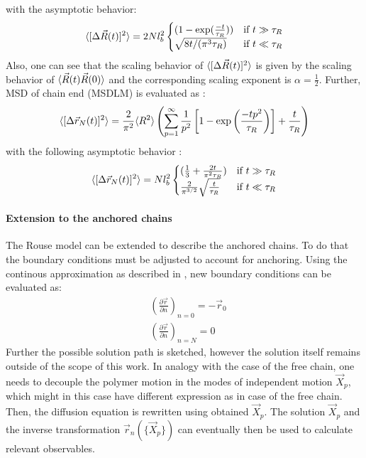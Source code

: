\documentclass[
    paper=A4,pagesize=automedia,fontsize=12pt,
    BCOR=15mm,DIV=22,
    twoside,headinclude,footinclude=false,
    fleqn,             %
    bibliography=totocnumbered,          %
    listof=totoc,                %
    listof=flat,                 %
    cleardoublepage=empty      %
    numbers=endperiod
]{scrartcl}
\begin{document}
with the asymptotic behavior:
\begin{equation}
    \langle[\Delta \vec{R}(t)]^2\rangle = 2Nl_b^2 \begin{cases}
        (1-\exp(\frac{-t}{\tau_R})) & \text{if } t \gg \tau_R \\
        \sqrt{8t/(\pi^3\tau_R)} & \text{if } t \ll \tau_R
    \end{cases}
\end{equation}
Also, one can see that the scaling behavior of $\langle[\Delta \vec{R}(t)]^2\rangle$ is given
by the scaling behavior of $\langle\vec{R}(t)\vec{R}(0)\rangle$ and the corresponding
scaling exponent is $\alpha = \frac{1}{2}$. Further, 
MSD of chain end (MSDLM) is evaluated as \cite{svaneborg_2020}:
\begin{equation}
    \langle[\Delta \vec{r}_N(t)]^2\rangle = \frac{2}{\pi^2} \langle R^2\rangle \left( \sum_{p=1}^{\infty} \frac{1}{p^2} \left[ 1-\exp\left(\frac{-t p^2}{\tau_R}\right) \right] + \frac{t}{\tau_R} \right)
\end{equation}
with the following asymptotic behavior \cite{svaneborg_2020}:
\begin{equation}
    \langle[\Delta \vec{r}_N(t)]^2\rangle = N l_b^2 \begin{cases}
        (\frac{1}{3} + \frac{2t}{\pi^2 \tau_R}) & \text{if } t \gg \tau_R \\
        \frac{2}{\pi^{3/2}} \sqrt{\frac{t}{\tau_R}} & \text{if } t \ll \tau_R
    \end{cases}
\end{equation}

\paragraph{Extension to the anchored chains}
The Rouse model can be extended to describe the anchored chains. To do that the boundary conditions 
must be adjusted to account for anchoring. Using the continous approximation as described in 
\cite{Doi_Edwards_PD:1994}, new boundary conditions can be evaluated as:
\begin{equation}
    \label{eq:rouse_boundary_anchored}
    \begin{aligned}
        & \left(\frac{\partial \vec{r}}{\partial n}\right)_{n=0} = - \vec{r}_0\\
        & \left(\frac{\partial \vec{r}}{\partial n}\right)_{n=N} = 0
    \end{aligned}
\end{equation}
Further the possible solution path is sketched, however the solution itself remains outside of the scope
of this work. In analogy with the case of the free chain, one needs to decouple the polymer motion in 
the modes of independent motion $\vec{X}_p$, which might in this case have different expression 
as in case of the free chain. Then, the diffusion equation is rewritten using obtained $\vec{X}_p$.
The solution $\vec{X}_p$ and the inverse transformation $\vec{r}_n(\{\vec{X}_p\})$ can eventually then
be used to calculate relevant observables.
\end{document}
